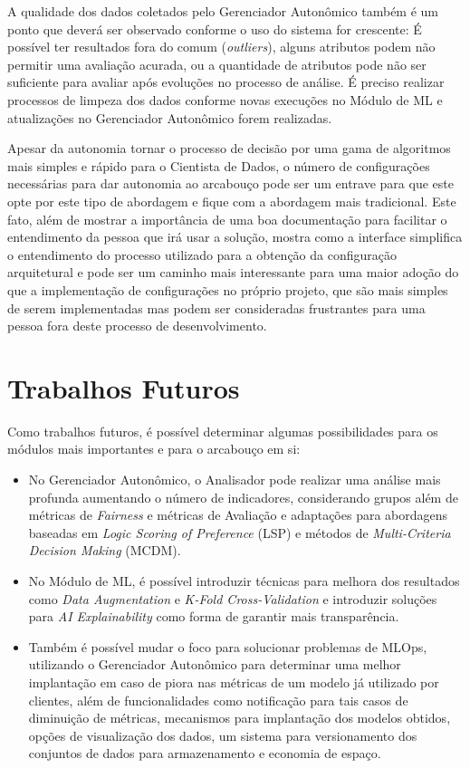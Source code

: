 \documentclass[Portugues,Final]{ic-tese-v3}
\begin{document}
A qualidade dos dados coletados pelo Gerenciador Autonômico também é um ponto que deverá ser observado conforme o uso do sistema for crescente: É possível ter resultados fora do comum (\textit{outliers}), alguns atributos podem não permitir uma avaliação acurada, ou a quantidade de atributos pode não ser suficiente para avaliar após evoluções no processo de análise. É preciso realizar processos de limpeza dos dados conforme novas execuções no Módulo de ML e atualizações no Gerenciador Autonômico forem realizadas.

Apesar da autonomia tornar o processo de decisão por uma gama de algoritmos mais simples e rápido para o Cientista de Dados, o número de configurações necessárias para dar autonomia ao arcabouço pode ser um entrave para que este opte por este tipo de abordagem e fique com a abordagem mais tradicional. Este fato, além de mostrar a importância de uma boa documentação para facilitar o entendimento da pessoa que irá usar a solução, mostra como a interface simplifica o entendimento do processo utilizado para a obtenção da configuração arquitetural e pode ser um caminho mais interessante para uma maior adoção do que a implementação de configurações no próprio projeto, que são mais simples de serem implementadas mas podem ser consideradas frustrantes para uma pessoa fora deste processo de desenvolvimento. 

\section{Trabalhos Futuros}

Como trabalhos futuros, é possível determinar algumas possibilidades para os módulos mais importantes e para o arcabouço em si:

\begin{itemize}
\item No Gerenciador Autonômico, o Analisador pode realizar uma análise mais profunda aumentando o número de indicadores, considerando grupos além de métricas de \textit{Fairness} e métricas de Avaliação e adaptações para abordagens baseadas em \textit{Logic Scoring of Preference} (LSP) e métodos de \textit{Multi-Criteria Decision Making} (MCDM). 

\item No Módulo de ML, é possível introduzir técnicas para melhora dos resultados como \textit{Data Augmentation} e \textit{K-Fold Cross-Validation} e introduzir soluções para \textit{AI Explainability} como forma de garantir mais transparência. 

\item Também é possível mudar o foco para solucionar problemas de MLOps, utilizando o Gerenciador Autonômico para determinar uma melhor implantação em caso de piora nas métricas de um modelo já utilizado por clientes, além de funcionalidades como notificação para tais casos de diminuição de métricas, mecanismos para implantação dos modelos obtidos, opções de visualização dos dados, um sistema para versionamento dos conjuntos de dados para armazenamento e economia de espaço.
\end{itemize}
\end{document}
